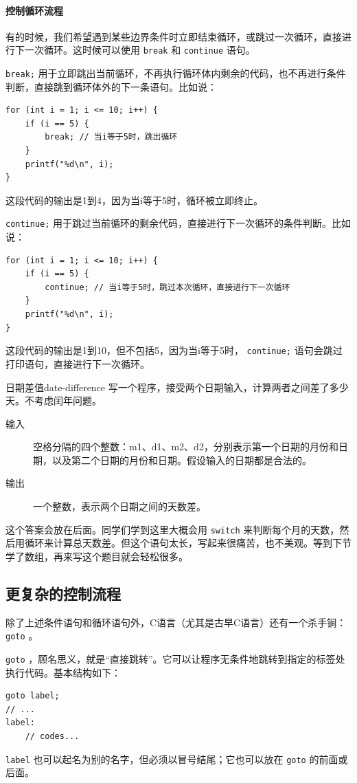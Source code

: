 \paragraph{控制循环流程} 有的时候，我们希望遇到某些边界条件时立即结束循环，或跳过一次循环，直接进行下一次循环。这时候可以使用 \verb|break| 和 \verb|continue| 语句。

\verb|break;| 用于立即跳出当前循环，不再执行循环体内剩余的代码，也不再进行条件判断，直接跳到循环体外的下一条语句。比如说：
\begin{verbatim}
for (int i = 1; i <= 10; i++) {
    if (i == 5) {
        break; // 当i等于5时，跳出循环
    }
    printf("%d\n", i);
}
\end{verbatim}
这段代码的输出是1到4，因为当i等于5时，循环被立即终止。

\verb|continue;| 用于跳过当前循环的剩余代码，直接进行下一次循环的条件判断。比如说：
\begin{verbatim}
for (int i = 1; i <= 10; i++) {
    if (i == 5) {
        continue; // 当i等于5时，跳过本次循环，直接进行下一次循环
    }
    printf("%d\n", i);
}
\end{verbatim}
这段代码的输出是1到10，但不包括5，因为当i等于5时， \verb|continue;| 语句会跳过打印语句，直接进行下一次循环。

\begin{example}{日期差值}{date-difference}
    写一个程序，接受两个日期输入，计算两者之间差了多少天。不考虑闰年问题。
    \begin{description}
        \item[输入] 空格分隔的四个整数：m1、d1、m2、d2，分别表示第一个日期的月份和日期，以及第二个日期的月份和日期。假设输入的日期都是合法的。
        \item[输出] 一个整数，表示两个日期之间的天数差。
    \end{description}
\tcblower
这个答案会放在后面。同学们学到这里大概会用 \verb|switch| 来判断每个月的天数，然后用循环来计算总天数差。但这个语句太长，写起来很痛苦，也不美观。等到下节学了数组，再来写这个题目就会轻松很多。
\end{example}

\subsection{更复杂的控制流程}

除了上述条件语句和循环语句外，C语言（尤其是古早C语言）还有一个杀手锏： \verb|goto| 。

\verb|goto| ，顾名思义，就是“直接跳转”。它可以让程序无条件地跳转到指定的标签处执行代码。基本结构如下：
\begin{verbatim}
goto label;
// ...
label:
    // codes...
\end{verbatim}
\verb|label| 也可以起名为别的名字，但必须以冒号结尾；它也可以放在 \verb|goto| 的前面或后面。

